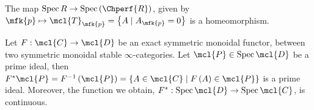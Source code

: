 \begin{theorem}
	The map $\spec R \to \spec\left(\Chperf{R}\right)$,
	given by $\mfk{p} \mapsto \mcl{T}_\mfk{p} = \left\{ A \mid A_\mfk{p} = 0 \right\}$
	is a homeomorphism.
\end{theorem}

\begin{proposition}\label{primes-pullback}
	Let $F: \mcl{C} \to \mcl{D}$ be an exact symmetric monoidal functor, between two symmetric monoidal stable $\infty$-categories.
	Let $\mcl{P} \in \spec \mcl{D}$ be a prime ideal, then $F^*\mcl{P} = F^{-1}\left(\mcl{P}\right) = \left\{ A \in \mcl{C} \mid F\left(A\right) \in \mcl{P} \right\}$ is a prime ideal.
	Moreover, the function we obtain, $F^*: \spec \mcl{D} \to \spec \mcl{C}$, is continuous.
\end{proposition}

